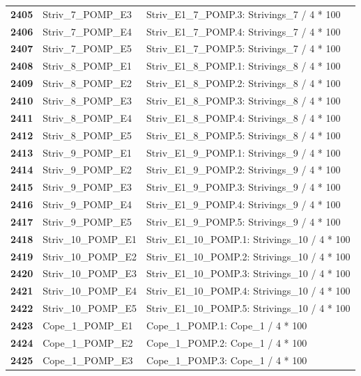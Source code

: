 \documentclass[
  letterpaper,
  DIV=11,
  numbers=noendperiod]{scrartcl}
\begin{document}
\begin{longtable}[t]{>{}cll}
\textbf{2405} & Striv\_7\_POMP\_E3 & Striv\_E1\_7\_POMP.3: Strivings\_7 / 4 * 100\\
\addlinespace
\textbf{2406} & Striv\_7\_POMP\_E4 & Striv\_E1\_7\_POMP.4: Strivings\_7 / 4 * 100\\
\textbf{2407} & Striv\_7\_POMP\_E5 & Striv\_E1\_7\_POMP.5: Strivings\_7 / 4 * 100\\
\textbf{2408} & Striv\_8\_POMP\_E1 & Striv\_E1\_8\_POMP.1: Strivings\_8 / 4 * 100\\
\textbf{2409} & Striv\_8\_POMP\_E2 & Striv\_E1\_8\_POMP.2: Strivings\_8 / 4 * 100\\
\textbf{2410} & Striv\_8\_POMP\_E3 & Striv\_E1\_8\_POMP.3: Strivings\_8 / 4 * 100\\
\addlinespace
\textbf{2411} & Striv\_8\_POMP\_E4 & Striv\_E1\_8\_POMP.4: Strivings\_8 / 4 * 100\\
\textbf{2412} & Striv\_8\_POMP\_E5 & Striv\_E1\_8\_POMP.5: Strivings\_8 / 4 * 100\\
\textbf{2413} & Striv\_9\_POMP\_E1 & Striv\_E1\_9\_POMP.1: Strivings\_9 / 4 * 100\\
\textbf{2414} & Striv\_9\_POMP\_E2 & Striv\_E1\_9\_POMP.2: Strivings\_9 / 4 * 100\\
\textbf{2415} & Striv\_9\_POMP\_E3 & Striv\_E1\_9\_POMP.3: Strivings\_9 / 4 * 100\\
\addlinespace
\textbf{2416} & Striv\_9\_POMP\_E4 & Striv\_E1\_9\_POMP.4: Strivings\_9 / 4 * 100\\
\textbf{2417} & Striv\_9\_POMP\_E5 & Striv\_E1\_9\_POMP.5: Strivings\_9 / 4 * 100\\
\textbf{2418} & Striv\_10\_POMP\_E1 & Striv\_E1\_10\_POMP.1: Strivings\_10 / 4 * 100\\
\textbf{2419} & Striv\_10\_POMP\_E2 & Striv\_E1\_10\_POMP.2: Strivings\_10 / 4 * 100\\
\textbf{2420} & Striv\_10\_POMP\_E3 & Striv\_E1\_10\_POMP.3: Strivings\_10 / 4 * 100\\
\addlinespace
\textbf{2421} & Striv\_10\_POMP\_E4 & Striv\_E1\_10\_POMP.4: Strivings\_10 / 4 * 100\\
\textbf{2422} & Striv\_10\_POMP\_E5 & Striv\_E1\_10\_POMP.5: Strivings\_10 / 4 * 100\\
\textbf{2423} & Cope\_1\_POMP\_E1 & Cope\_1\_POMP.1: Cope\_1 / 4 * 100\\
\textbf{2424} & Cope\_1\_POMP\_E2 & Cope\_1\_POMP.2: Cope\_1 / 4 * 100\\
\textbf{2425} & Cope\_1\_POMP\_E3 & Cope\_1\_POMP.3: Cope\_1 / 4 * 100\\

\end{longtable}
\end{document}
